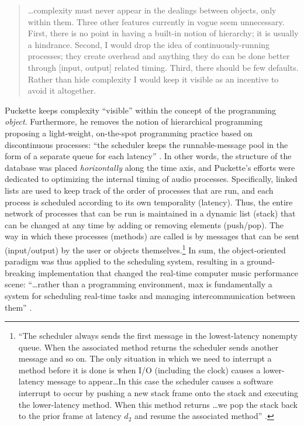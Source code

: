 	\begin{quote}
		\dots complexity must never appear in the dealings between objects, only within them. Three other features currently in vogue seem unnecessary. First, there is no point in having a built-in notion of hierarchy; it is usually a hindrance. Second, I would drop the idea of continuously-running processes; they create overhead and anything they do can be done better through [input, output] related timing. Third, there should be few defaults. Rather than hide complexity I would keep it visible as an incentive to avoid it altogether. \parencite[43]{DBLP:conf/icmc/Puckette86}
	\end{quote}

	Puckette keeps complexity ``visible'' within the concept of the programming \textit{object}. Furthermore, he removes the notion of hierarchical programming proposing a light-weight, on-the-spot programming practice based on discontinuous processes: ``the scheduler keeps the runnable-message pool in the form of a separate queue for each latency'' \parencite[46]{DBLP:conf/icmc/Puckette86}. In other words, the structure of the database was placed \textit{horizontally} along the time axis, and Puckette's efforts were dedicated to optimizing the internal timing of audio processes. Specifically, linked lists are used to keep track of the order of processes that are run, and each process is scheduled according to its own temporality (latency). Thus, the entire network of processes that can be run is maintained in a dynamic list (stack) that can be changed at any time by adding or removing elements (push/pop). The way in which these processes (methods) are called is by messages that can be sent (input/output) by the user or objects themselves.\footnote{``The scheduler always sends the first message in the lowest-latency nonempty queue. When the associated method returns the scheduler sends another message and so on. The only situation in which we need to interrupt a method before it is done is when I/O (including the clock) causes a lower-latency message to appear\dots In this case the scheduler causes a software interrupt to occur by pushing a new stack frame onto the stack and executing the lower-latency method. When this method returns \dots we pop the stack back to the prior frame at latency \(d_2\) and resume the associated method'' \parencite[46]{DBLP:conf/icmc/Puckette86}.} In sum, the object-oriented paradigm was thus applied to the scheduling system, resulting in a ground-breaking implementation that changed the real-time computer music performance scene: ``\dots rather than a programming environment, \gls{max} is fundamentally a system for scheduling real-time tasks and managing intercommunication between them'' \parencite{DBLP:journals/comj/Puckette02}.

